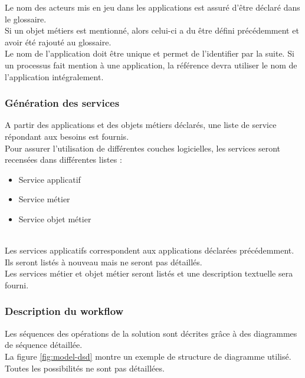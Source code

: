 Le nom des acteurs mis en jeu dans les applications est assuré d'être déclaré
dans le glossaire. \\

Si un objet métiers est mentionné, alors celui-ci a du être défini précédemment
et avoir été rajouté au glossaire. \\

Le nom de l'application doit être unique et permet de l'identifier par la
suite. Si un processus fait mention à une application, la référence devra
utiliser le nom de l'application intégralement. \\

\subsubsection{Génération des services}
A partir des applications et des objets métiers déclarés, une liste de service
répondant aux besoins est fournis. \\

Pour assurer l'utilisation de différentes couches logicielles, les services
seront recensées dans différentes listes : \\
\begin{itemize}
  \item Service applicatif
  \item Service métier
  \item Service objet métier
\end{itemize}

~\\

Les services applicatifs correspondent aux applications déclarées précédemment.
Ils seront listés à nouveau mais ne seront pas détaillés. \\

Les services métier et objet métier seront listés et une description textuelle
sera fourni. \\

\subsubsection{Description du workflow}
Les séquences des opérations de la solution sont décrites grâce à des
diagrammes de séquence détaillée. \\

La figure \ref{fig:model-dsd} montre un exemple de structure de diagramme
utilisé. Toutes les possibilités ne sont pas détaillées. \\

